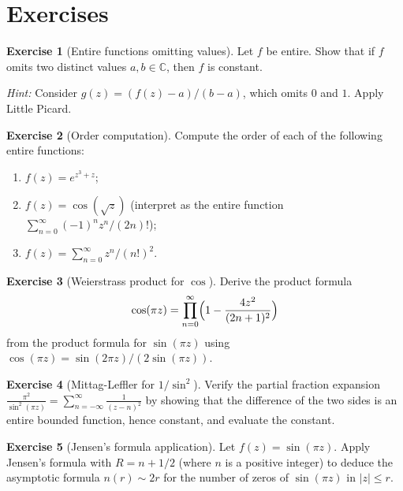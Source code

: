 \documentclass[12pt,a4paper,openany]{book}
\theoremstyle{definition}
\newtheorem{exercise}{Exercise}[chapter]
\theoremstyle{plain}
\theoremstyle{remark}
\newcommand{\C}{\mathbb{C}}
\newcommand{\abs}[1]{\left|#1\right|}
\begin{document}
\section{Exercises}\label{sec:exercises-ch10}

\begin{exercise}[Entire functions omitting values]\label{exer:entire-omit}
Let $f$ be entire. Show that if $f$ omits two distinct values
$a, b \in \C$, then $f$ is constant.

\emph{Hint:} Consider $g(z) = (f(z)-a)/(b-a)$, which omits $0$ and $1$.
Apply Little Picard.
\end{exercise}

\begin{exercise}[Order computation]\label{exer:order-comp}
Compute the order of each of the following entire functions:
\begin{enumerate}[label=(\alph*)]
  \item $f(z) = e^{z^3 + z}$;
  \item $f(z) = \cos(\sqrt{z})$ (interpret as the entire function
    $\sum_{n=0}^{\infty}(-1)^n z^n/(2n)!$);
  \item $f(z) = \sum_{n=0}^{\infty} z^n / (n!)^2$.
\end{enumerate}
\end{exercise}

\begin{exercise}[Weierstrass product for $\cos$]\label{exer:cos-product}
Derive the product formula
\[
  \cos(\pi z) = \prod_{n=0}^{\infty}
  \Bigl(1 - \frac{4z^2}{(2n+1)^2}\Bigr)
\]
from the product formula for $\sin(\pi z)$ using
$\cos(\pi z) = \sin(2\pi z)/(2\sin(\pi z))$.
\end{exercise}

\begin{exercise}[Mittag-Leffler for $1/\sin^2$]\label{exer:mittag-leffler-csc2}
Verify the partial fraction expansion
$\displaystyle \frac{\pi^2}{\sin^2(\pi z)} = \sum_{n=-\infty}^{\infty}\frac{1}{(z-n)^2}$
by showing that the difference of the two sides is an entire bounded
function, hence constant, and evaluate the constant.
\end{exercise}

\begin{exercise}[Jensen's formula application]\label{exer:jensen-app}
Let $f(z) = \sin(\pi z)$. Apply Jensen's formula with $R = n + 1/2$
(where $n$ is a positive integer) to deduce the asymptotic formula
$n(r) \sim 2r$ for the number of zeros of $\sin(\pi z)$ in $\abs{z} \leq r$.
\end{exercise}
\end{document}
